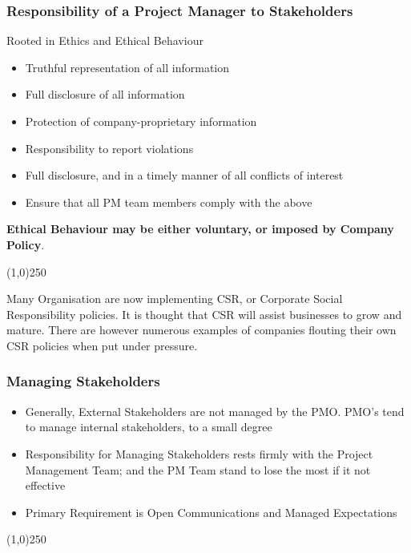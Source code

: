 \begin{frame}
\frametitle{Responsibility of a Project Manager to Stakeholders}
Rooted in Ethics and Ethical Behaviour\\
\begin{itemize}
\item Truthful representation of all information
\item Full disclosure of all information
\item Protection of company-proprietary information
\item Responsibility to report violations
\item Full disclosure, and in a timely manner of all conflicts of interest
\item Ensure that all PM team members comply with the above
\end{itemize}
\textbf{Ethical Behaviour may be either voluntary, or imposed by Company Policy}.\\
\end{frame}
\begin{center}\line(1,0){250}\end{center}
Many Organisation are now implementing CSR, or Corporate Social Responsibility policies.  It is thought that CSR will assist businesses to grow and mature.  There are however numerous examples of companies flouting their own CSR policies when put under pressure.




\begin{frame}
\frametitle{Managing Stakeholders}
\begin{itemize}
	\item Generally, External Stakeholders are not managed by the PMO.  PMO's tend to manage internal stakeholders, to a small degree
	\item Responsibility for Managing Stakeholders rests firmly with the Project Management Team; and the PM Team stand to lose the most if it not effective
	\item Primary Requirement is Open Communications and Managed Expectations
\end{itemize}
\end{frame}
\begin{center}\line(1,0){250}\end{center}



